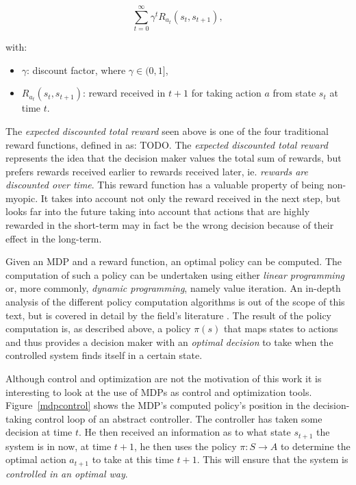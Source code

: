 \[
\sum_{t=0}^{\infty} {\gamma}^{t}R_{a_t}(s_t,s_{t+1}),
\]

with:
\begin{itemize}
\item $\gamma$: discount factor, where $\gamma\in(0,1]$,
\item $R_{a_t}(s_t,s_{t+1})$: reward received in $t+1$ for taking action $a$ from state $s_t$ at time $t$.	
\end{itemize}

The \textit{expected discounted total reward} seen above is one of the four traditional reward functions, defined in \cite{puterman} as: TODO. The \textit{expected discounted total reward} represents the idea that the decision maker values the total sum of rewards, but prefers rewards received earlier to rewards received later, ie. \textit{rewards are discounted over time}. This reward function has a valuable property of being non-myopic. It takes into account not only the reward received in the next step, but looks far into the future taking into account that actions that are highly rewarded in the short-term may in fact be the wrong decision because of their effect in the long-term. 

Given an MDP and a reward function, an optimal policy can be computed. The computation of such a policy can be undertaken using either \textit{linear programming} or, more commonly, \textit{dynamic programming}, namely value iteration. An in-depth analysis of the different policy computation algorithms is out of the scope of this text, but is covered in detail by the field's literature \cite{puterman}. The result of the policy computation is, as described above, a policy $\pi(s)$ that maps states to actions and thus provides a decision maker with an \textit{optimal decision} to take when the controlled system finds itself in a certain state.

Although control and optimization are not the motivation of this work it is interesting to look at the use of MDPs as control and optimization tools. Figure~\ref{mdpcontrol} shows the MDP's computed policy's position in the decision-taking control loop of an abstract controller. The controller has taken some decision at time $t$. He then received an information as to what state $s_{t+1}$ the system is in now, at time $t+1$, he then uses the policy $\pi: S \rightarrow A$ to determine the optimal action $a_{t+1}$ to take at this time $t+1$. This will ensure that the system is \textit{controlled in an optimal way}.

